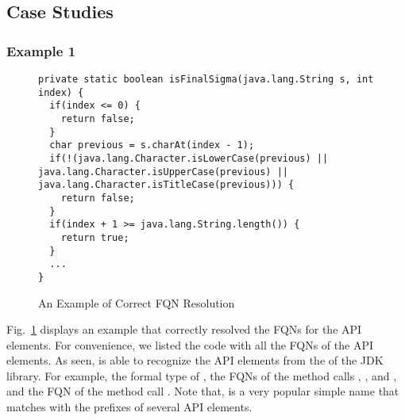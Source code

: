 \subsection{Case Studies}

\subsubsection{Example 1}

\begin{figure}[t]
	\centering
\begin{lstlisting}[]
private static boolean isFinalSigma(java.lang.String s, int index) {
  if(index <= 0) {
    return false;
  }
  char previous = s.charAt(index - 1);
  if(!(java.lang.Character.isLowerCase(previous) || java.lang.Character.isUpperCase(previous) || java.lang.Character.isTitleCase(previous))) {
    return false;
  }
  if(index + 1 >= java.lang.String.length()) {
    return true;
  }
  ...
}
\end{lstlisting}
        \vspace{-12pt}
        \caption{An Example of Correct FQN Resolution}
        \label{fig:ex1}
\end{figure}

Fig.~\ref{fig:ex1} displays an example that {\tool} correctly resolved
the FQNs for the API elements. For convenience, we listed the code
with all the FQNs of the API elements. As seen, {\tool} is able to
recognize the API elements from the  of the JDK
library. For example, the formal type  of , the
FQNs of the method calls , , and
, and the FQN of the method call .
Note that,  is a very popular simple name that matches
with the prefixes of several API elements.




